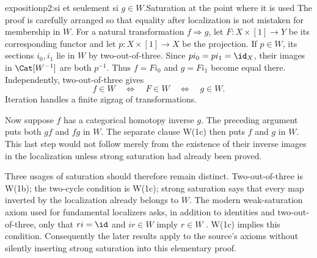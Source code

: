 \begin{dcomment}{exposition}{p2:si et seulement si $g \in W$.}{Saturation at the point where it is used}
The proof is carefully arranged so that equality after localization is not mistaken for membership in \(W\). For a natural transformation \(f\Rightarrow g\), let \(F:X\times[1]\to Y\) be its corresponding functor and let \(p:X\times[1]\to X\) be the projection. If \(p\in W\), its sections \(i_0,i_1\) lie in \(W\) by two-out-of-three. Since \(pi_0=pi_1=\id_X\), their images in \(\Cat[W^{-1}]\) are both \(p^{-1}\). Thus \(f=Fi_0\) and \(g=Fi_1\) become equal there. Independently, two-out-of-three gives
\[
 f\in W\quad\Longleftrightarrow\quad F\in W
 \quad\Longleftrightarrow\quad g\in W.
\]
Iteration handles a finite zigzag of transformations.

Now suppose \(f\) has a categorical homotopy inverse \(g\). The preceding argument puts both \(gf\) and \(fg\) in \(W\). The separate clause W(1c) then puts \(f\) and \(g\) in \(W\). This last step would not follow merely from the existence of their inverse images in the localization unless strong saturation had already been proved.

Three usages of saturation should therefore remain distinct. Two-out-of-three is W(1b); the two-cycle condition is W(1c); strong saturation says that every map inverted by the localization already belongs to \(W\). The modern weak-saturation axiom used for fundamental localizers asks, in addition to identities and two-out-of-three, only that \(ri=\id\) and \(ir\in W\) imply \(r\in W\) \citep[Definition~1.1.1]{Cisinski2004Minimal}. W(1c) implies this condition. Consequently the later results apply to the source's axioms without silently inserting strong saturation into this elementary proof.
\end{dcomment}

